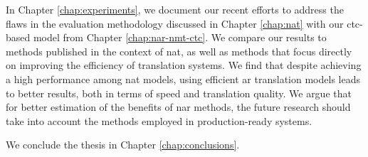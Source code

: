 In Chapter \ref{chap:experiments}, we document our recent efforts to address
the flaws in the evaluation methodology discussed in Chapter \ref{chap:nat}
with our \acs{ctc}-based model from Chapter \ref{chap:nar-nmt-ctc}. We compare
our results to methods published in the context of \ac{nat}, as well as methods
that focus directly on improving the efficiency of translation systems.  We
find that despite achieving a high performance among \ac{nat} models, using
efficient \acl{ar} translation models leads to better results, both in terms of
speed and translation quality. We argue that for better estimation of the
benefits of \acl{nar} methods, the future research should take into account the
methods employed in production-ready systems.

We conclude the thesis in Chapter \ref{chap:conclusions}.

